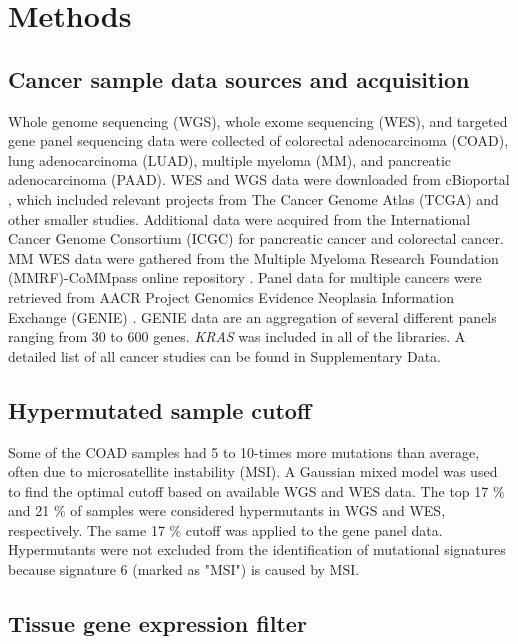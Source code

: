 \documentclass[english, 10pt, letterpaper]{article}
\newcommand{\KRAS}{\emph{KRAS}}
\begin{document}
\section*{Methods}

\subsection*{Cancer sample data sources and acquisition}

Whole genome sequencing (WGS), whole exome sequencing (WES), and targeted gene panel sequencing data were collected of colorectal adenocarcinoma (COAD), lung adenocarcinoma (LUAD), multiple myeloma (MM), and pancreatic adenocarcinoma (PAAD).
WES and WGS data were downloaded from cBioportal \cite{Gao2013, Cerami2012}, which included relevant projects from The Cancer Genome Atlas (TCGA) \cite{CancerGenomeAtlasNetwork2012, CancerGenomeAtlasResearchNetwork2014, CancerGenomeAtlasResearchNetwork.Electronicaddress:andrew_aguirredfci.harvard.edu2017} and other smaller studies. 
Additional data were acquired from the International Cancer Genome Consortium (ICGC) for pancreatic cancer \cite{Scarlett2011} and colorectal cancer. 
MM WES data were gathered from the Multiple Myeloma Research Foundation (MMRF)-CoMMpass online repository \cite{Walker2019AAnalysis.}.
Panel data for multiple cancers were retrieved from AACR Project Genomics Evidence Neoplasia Information Exchange (GENIE) \cite{AACRProjectGENIEConsortium2017AACRConsortium.}.
GENIE data are an aggregation of several different panels ranging from 30 to 600 genes.
\KRAS{} was included in all of the libraries. 
A detailed list of all cancer studies can be found in Supplementary Data.


\subsection*{Hypermutated sample cutoff}

Some of the COAD samples had 5 to 10-times more mutations than average, often due to microsatellite instability (MSI). 
A Gaussian mixed model was used to find the optimal cutoff based on available WGS and WES data. 
The top 17 \% and 21 \% of samples were considered hypermutants in WGS and WES, respectively.
The same 17 \% cutoff was applied to the gene panel data. 
Hypermutants were not excluded from the identification of mutational signatures because signature 6 (marked as "MSI") is caused by MSI.


\subsection*{Tissue gene expression filter}
\end{document}
